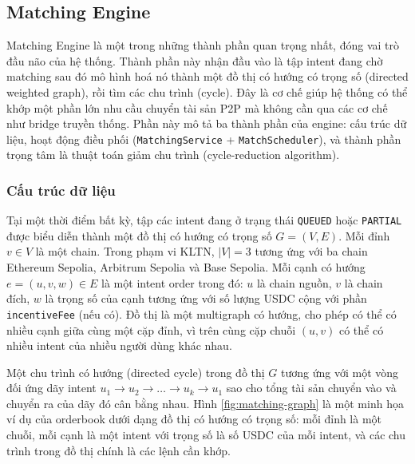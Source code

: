 
\subsection{Matching Engine}
\label{sec:matching-engine}

Matching Engine là một trong những thành phần quan trọng nhất, đóng vai trò đầu não của hệ thống. 
Thành phần này nhận đầu vào là tập intent đang chờ matching sau đó
mô hình hoá nó thành một đồ thị có hướng có trọng số (directed weighted graph), 
rồi tìm các chu trình (cycle). 
Đây là cơ chế giúp hệ thống có thể khớp một phần lớn nhu cầu chuyển tài sản P2P
mà không cần qua các cơ chế như bridge truyền thống.
Phần này mô tả ba thành phần của engine: cấu trúc dữ liệu, hoạt động điều
 phối (\texttt{MatchingService} + \texttt{MatchScheduler}), và thành phần trọng tâm 
 là thuật toán giảm chu trình (cycle-reduction algorithm).

\subsubsection{Cấu trúc dữ liệu }

Tại một thời điểm bất kỳ, tập các intent đang ở trạng thái
 \texttt{QUEUED} hoặc \texttt{PARTIAL} được biểu diễn thành một đồ thị
  có hướng có trọng số $G = (V, E)$. Mỗi đỉnh $v \in V$ là một chain. 
  Trong phạm vi KLTN, $|V| = 3$ tương ứng với ba chain Ethereum Sepolia, Arbitrum Sepolia và Base Sepolia. 
  Mỗi cạnh có hướng $e = (u, v, w) \in E$ là một intent order trong đó: 
  $u$ là chain nguồn, $v$ là chain đích, 
  $w$ là trọng số của cạnh tương ứng với số lượng USDC cộng với phần 
  \texttt{incentiveFee} (nếu có). Đồ thị là một multigraph có hướng, 
  cho phép có thể có nhiều cạnh giữa cùng một cặp đỉnh, 
  vì trên cùng cặp chuỗi $(u, v)$ có thể có nhiều intent của nhiều người 
  dùng khác nhau.

Một chu trình có hướng (directed cycle) trong đồ thị $G$
tương ứng với một vòng đối ứng
dãy intent $u_1 \to u_2 \to \dots \to u_k \to u_1$ sao cho 
tổng tài sản chuyển vào và chuyển ra của dãy đó cân bằng nhau.
Hình \ref{fig:matching-graph} là một minh họa ví dụ của orderbook dưới dạng 
đồ thị có hướng có trọng số: mỗi đỉnh là một chuỗi, 
mỗi cạnh là một intent với trọng số là số USDC của mỗi intent, 
và các chu trình trong đồ thị chính là các lệnh cần khớp.

